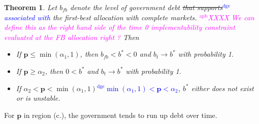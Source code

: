 \documentclass[12pt]{article}
\newcommand{\dge}[1]{\textcolor{blue}{$^{\textrm{dge}}${#1}}}
\newcommand{\apb}[1]{\textcolor{magenta}{$^{\textrm{apb}}${#1}}}
\newtheorem{theorem}{Theorem}[section]
\begin{document}
	

 	\begin{theorem}
Let %
$b_{fb}$ denote the level of  government  debt \st{that  supports}\dge{associated with} the first-best allocation with complete markets.
\apb{XXXX We can define this as the right hand side of the time 0 implementability constraint evaluated at the FB allocation right ?}
Then %
		\begin{itemize}
			\item[a.]  If $\bm{p}\leq\min(\alpha_1,1)$, then  $b_{fb}<b^*<0$ and $b_t\rightarrow b^*$ with probability 1.
			\item[b.] If $\bm{p} \geq \alpha_2$, then   $0<b^*$ and $b_t \rightarrow b^*$ with probability 1.
            \item[c.] If \st{$\alpha_2 < \bm{p} < \min	(\alpha_1,1)$}\dge{$ \min(\alpha_1,1)<\bm{p}<\alpha_2 $},   $b^*$ either does not exist or is unstable.
									\end{itemize}			\end{theorem}
  For $\bm{p}$ in region (c.),
the government tends to run up debt over time.
\end{document}
